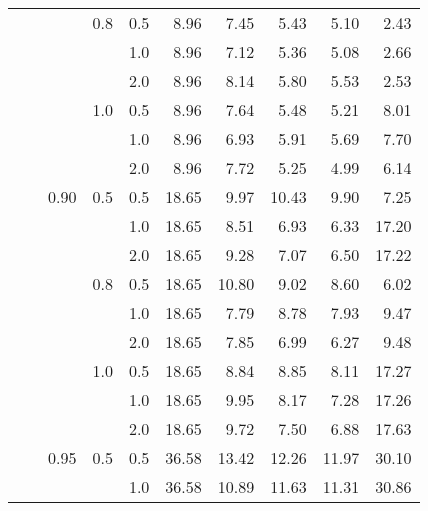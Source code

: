 \documentclass{article}
\begin{document}
{\begin{tabular}{lllllrrrrr}
            &     &      & 0.8 & 0.5 &    8.96 &    7.45 &              5.43 &                 5.10 &       2.43 \\
            &     &      &     & 1.0 &    8.96 &    7.12 &              5.36 &                 5.08 &       2.66 \\
            &     &      &     & 2.0 &    8.96 &    8.14 &              5.80 &                 5.53 &       2.53 \\
            &     &      & 1.0 & 0.5 &    8.96 &    7.64 &              5.48 &                 5.21 &       8.01 \\
            &     &      &     & 1.0 &    8.96 &    6.93 &              5.91 &                 5.69 &       7.70 \\
            &     &      &     & 2.0 &    8.96 &    7.72 &              5.25 &                 4.99 &       6.14 \\
            &     & 0.90 & 0.5 & 0.5 &   18.65 &    9.97 &             10.43 &                 9.90 &       7.25 \\
            &     &      &     & 1.0 &   18.65 &    8.51 &              6.93 &                 6.33 &      17.20 \\
            &     &      &     & 2.0 &   18.65 &    9.28 &              7.07 &                 6.50 &      17.22 \\
            &     &      & 0.8 & 0.5 &   18.65 &   10.80 &              9.02 &                 8.60 &       6.02 \\
            &     &      &     & 1.0 &   18.65 &    7.79 &              8.78 &                 7.93 &       9.47 \\
            &     &      &     & 2.0 &   18.65 &    7.85 &              6.99 &                 6.27 &       9.48 \\
            &     &      & 1.0 & 0.5 &   18.65 &    8.84 &              8.85 &                 8.11 &      17.27 \\
            &     &      &     & 1.0 &   18.65 &    9.95 &              8.17 &                 7.28 &      17.26 \\
            &     &      &     & 2.0 &   18.65 &    9.72 &              7.50 &                 6.88 &      17.63 \\
            &     & 0.95 & 0.5 & 0.5 &   36.58 &   13.42 &             12.26 &                11.97 &      30.10 \\
            &     &      &     & 1.0 &   36.58 &   10.89 &             11.63 &                11.31 &      30.86 \\

\end{tabular}}
\end{document}
